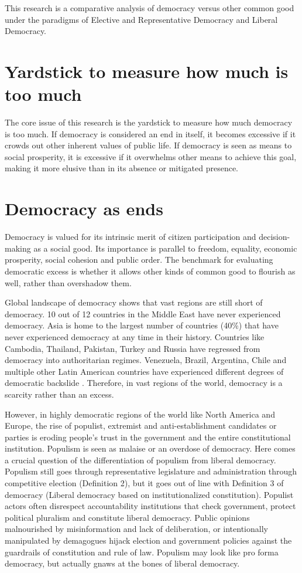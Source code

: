 \documentclass{scrartcl}
\theoremstyle{definition}
\begin{document}
This research is a comparative analysis of democracy versus other common good under the paradigms of Elective and Representative Democracy and Liberal Democracy. 

\section{Yardstick to measure how much is too much}

The core issue of this research is the yardstick to measure how much democracy is too much. If democracy is considered an end in itself, it becomes excessive if it crowds out other inherent values of public life. If democracy is seen as means to social prosperity, it is excessive if it overwhelms other means to achieve this goal, making it more elusive than in its absence or mitigated presence. 

\section{Democracy as ends}

Democracy is valued for its intrinsic merit of citizen participation and decision-making as a social good. Its importance is parallel to freedom, equality, economic prosperity, social cohesion and public order. The benchmark for evaluating democratic excess is whether it allows other kinds of common good to flourish as well, rather than overshadow them. 

Global landscape of democracy shows that vast regions are still short of democracy. 10 out of 12 countries in the Middle East have never experienced democracy. Asia is home to the largest number of countries (40\%) that have never experienced democracy at any time in their history. Countries like Cambodia, Thailand, Pakistan, Turkey and Russia have regressed from democracy into authoritarian regimes. Venezuela, Brazil, Argentina, Chile and multiple other Latin American countries have experienced different degrees of democratic backslide \autocite{IDEA}. Therefore, in vast regions of the world, democracy is a scarcity rather than an excess. 

However, in highly democratic regions of the world like North America and Europe, the rise of populist, extremist and anti-establishment candidates or parties is eroding people's trust in the government and the entire constitutional institution. Populism is seen as malaise or an overdose of democracy. Here comes a crucial question of the differentiation of populism from liberal democracy. Populism still goes through representative legislature and administration through competitive election (Definition 2), but it goes out of line with Definition 3 of democracy (Liberal democracy based on institutionalized constitution). Populist actors often disrespect accountability institutions that check government, protect political pluralism and constitute liberal democracy. Public opinions malnourished by misinformation and lack of deliberation, or intentionally manipulated by demagogues hijack election and government policies against the guardrails of constitution and rule of law. Populism may look like pro forma democracy, but actually gnaws at the bones of liberal democracy. 
\end{document}
